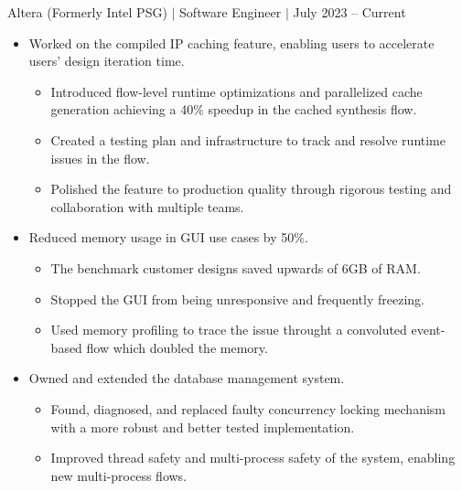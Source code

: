 \documentclass[12pt]{article}
\newcommand{\textDate}[3]{\noindent#1 $|$ #2 $|$ {\color{textGray} #3}}
\begin{document}
    \textDate{Altera (Formerly Intel PSG)}{Software Engineer}{July 2023 -- Current}
    \begin{small}
        \begin{itemize}
            \itemsep0em 

            \item {Worked on the compiled IP caching feature, enabling users to accelerate users' design iteration time.}
                \begin{itemize}[label=$\circ$,topsep=-5px,partopsep=0px]
                    \itemsep0em 
                    \item {Introduced flow-level runtime optimizations and parallelized cache generation achieving a 40\% speedup in the cached synthesis flow.}
                    \item {Created a testing plan and infrastructure to track and resolve runtime issues in the flow.}
                    \item {Polished the feature to production quality through rigorous testing and collaboration with multiple teams.}
                \end{itemize}

            \item {Reduced memory usage in GUI use cases by 50\%.}
                \begin{itemize}[label=$\circ$,topsep=-5px,partopsep=0px]
                    \itemsep0em 
                    \item {The benchmark customer designs saved upwards of 6GB of RAM.}
                    \item {Stopped the GUI from being unresponsive and frequently freezing.}
                    \item {Used memory profiling to trace the issue throught a convoluted event-based flow which doubled the memory.}
                \end{itemize}

            \item {Owned and extended the database management system.}
                \begin{itemize}[label=$\circ$,topsep=-5px,partopsep=0px]
                    \itemsep0em 
                    \item {Found, diagnosed, and replaced faulty concurrency locking mechanism with a more robust and better tested implementation.}
                    \item {Improved thread safety and multi-process safety of the system, enabling new multi-process flows.}
                \end{itemize}


\end{itemize}
\end{small}
\end{document}
